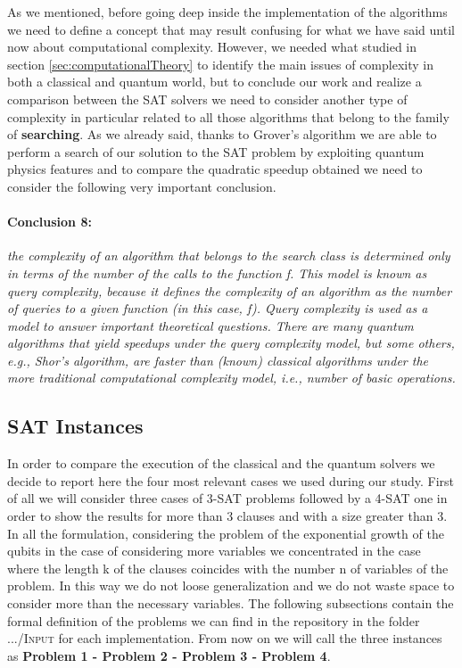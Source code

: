 \documentclass[english]{article}
\begin{document}
		As we mentioned, before going deep inside the implementation of the algorithms we need to define a concept that may result confusing for what we have said until now about computational complexity. However, we needed what studied in section \ref{sec:computationalTheory} to identify the main issues of complexity in both a classical and quantum world, but to conclude our work and realize a comparison between the SAT solvers we need to consider another type of complexity in particular related to all those algorithms that belong to the family of \textbf{searching}. As we already said, thanks to Grover's algorithm we are able to perform a search of our solution to the SAT problem by exploiting quantum physics features and to compare the quadratic speedup obtained we need to consider the following very important conclusion.
		
		\paragraph{Conclusion 8:} \label{conc:queryCompl} \emph{the complexity of an algorithm that belongs to the search class is determined only in terms of the number of the calls to the function f. This model is known as query complexity, because it defines the complexity of an algorithm as the number of queries to a given function (in this case, f). Query complexity is used as a model to answer important theoretical questions. There are many quantum algorithms that yield speedups under the query complexity model, but some others, e.g., Shor's algorithm, are faster than (known)
		classical algorithms under the more traditional computational complexity model, i.e., number of
		basic operations.}
	
		\subsection{SAT Instances}
		\label{sec:satInstances}
			In order to compare the execution of the classical and the quantum solvers we decide to report here the four most relevant cases we used during our study. First of all we will consider three cases of 3-SAT problems followed by a 4-SAT one in order to show the results for more than 3 clauses and with a size greater than 3. In all the formulation, considering the problem of the exponential growth of the qubits in the case of considering more variables we concentrated in the case where the length k of the clauses coincides with the number n of variables of the problem. In this way we do not loose generalization and we do not waste space to consider more than the necessary variables. The following subsections contain the formal definition of the problems we can find in the repository in the folder \textsc{.../Input} for each implementation. From now on we will call the three instances as \textbf{Problem 1 - Problem 2 - Problem 3 - Problem 4}.
			
\end{document}
